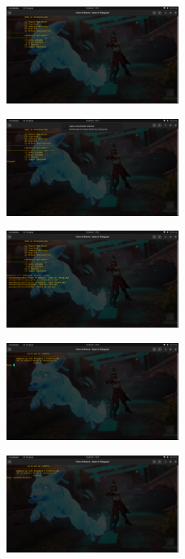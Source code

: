 \documentclass[letterpaper,12pt]{article} %
\begin{document}
\begin{figure}[H]
    \centering
    \includegraphics[width=0.5\textwidth]{figurasShell/Audio5.png}
\end{figure}

\begin{figure}[H]
    \centering
    \includegraphics[width=0.5\textwidth]{figurasShell/Audio6.png}
\end{figure}

\begin{figure}[H]
    \centering
    \includegraphics[width=0.5\textwidth]{figurasShell/Audio7.png}
\end{figure}

\begin{figure}[H]
    \centering
    \includegraphics[width=0.5\textwidth]{figurasShell/Audio8.png}
\end{figure}

\begin{figure}[H]
    \centering
    \includegraphics[width=0.5\textwidth]{figurasShell/Audios9.png}
\end{figure}
\end{document}
